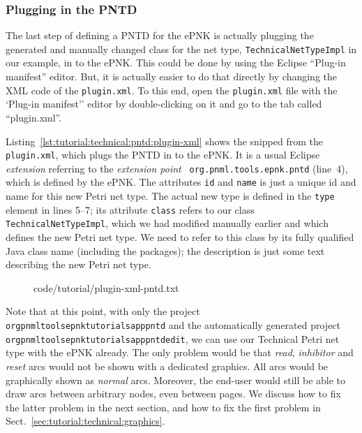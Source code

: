 \subsubsection{Plugging in the PNTD}
\label{subsec:tutorial:technical:pntd:plugin}

The last step of defining a PNTD for the ePNK is actually plugging the generated
and manually changed class for the net type, {\tt TechnicalNetTypeImpl} in our
example, in to the ePNK. This could be done by using the Eclipse ``Plug-in
manifest'' editor. But, it is actually easier to do that directly by changing
the XML code of the {\tt plugin.xml}. To this end, open the {\tt plugin.xml}
file with the `Plug-in manifest'' editor by double-clicking on it and go to
the tab called ``plugin.xml''.

Listing~\ref{lst:tutorial:technical:pntd:plugin-xml} shows the snipped from the
{\tt plugin.xml}, which plugs the PNTD in to the ePNK. It is a usual Eclipse
\emph{extension}  referring to the \emph{extension point} {\tt
org.pnml.tools.epnk.pntd} (line~4), which is defined by the ePNK. The attributes
{\tt id} and {\tt name} is just a unique id and name for this new Petri net
type. The actual new type is defined in the {\tt type} element in lines 5--7;
its attribute {\tt class} refers to our class {\tt TechnicalNetTypeImpl},
which we had modified manually earlier and which defines the new Petri net type.
We need to refer to this class by its fully qualified Java class name
(including the packages); the description is just some text describing the new Petri net type.
 
\begin{figure}[htbp!]
%
  {code/tutorial/plugin-xml-pntd.txt}
\end{figure}

Note that at this point, with only the project {\tt
org\qnsep{}pnml\qnsep{}tools\qnsep{}epnk\qnsep{}tutorials\qnsep{}app\qnsep{}pntd}
and the automatically generated project
{\tt org\qnsep{}pnml\qnsep{}tools\qnsep{}epnk\qnsep{}tutorials\qnsep{}app\qnsep{}pntd\qnsep{}edit},
we can use our Technical Petri
net type with the ePNK already. The only problem would be that \emph{read},
\emph{inhibitor} and \emph{reset} arcs would not be shown with a dedicated
graphics. All arcs would be graphically shown as \emph{normal} arcs. Moreover,
the end-user would still be able to draw arcs between arbitrary nodes, even
between pages. We discuss how to fix the latter problem in the next section, and
how to fix the first problem in Sect.~\ref{sec:tutorial:technical:graphics}.

